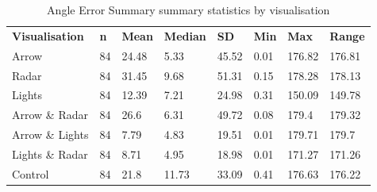 \begin{table}[]
\caption{Angle Error Summary summary statistics by visualisation}
\label{tab:Angle_Error_Summary}
\begin{tabular}{llllllll}
\textbf{Visualisation} & \textbf{n} & \textbf{Mean} & \textbf{Median} & \textbf{SD} & \textbf{Min} & \textbf{Max} & \textbf{Range} \\
Arrow                  & 84         & 24.48         & 5.33            & 45.52       & 0.01         & 176.82       & 176.81 \\
Radar                  & 84         & 31.45         & 9.68            & 51.31       & 0.15         & 178.28       & 178.13 \\
Lights                 & 84         & 12.39         & 7.21            & 24.98       & 0.31         & 150.09       & 149.78 \\
Arrow \& Radar         & 84         & 26.6          & 6.31            & 49.72       & 0.08         & 179.4        & 179.32 \\
Arrow \& Lights        & 84         & 7.79          & 4.83            & 19.51       & 0.01         & 179.71       & 179.7 \\
Lights \& Radar        & 84         & 8.71          & 4.95            & 18.98       & 0.01         & 171.27       & 171.26 \\
Control                & 84         & 21.8          & 11.73           & 33.09       & 0.41         & 176.63       & 176.22
\end{tabular}
\end{table}
